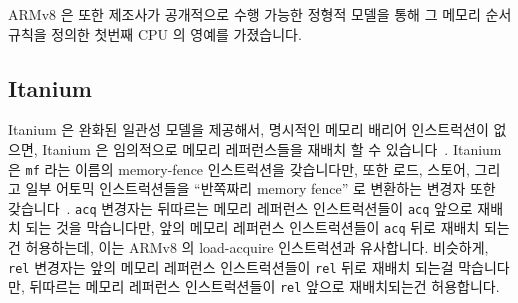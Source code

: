 ARMv8 은 또한 제조사가 공개적으로 수행 가능한 정형적 모델을 통해 그 메모리 순서
규칙을 정의한 첫번째 CPU 의 영예를 가졌습니다.

\subsection{Itanium}
\label{sec:memorder:Itanium}

Itanium 은 완화된 일관성 모델을 제공해서, 명시적인 메모리 배리어 인스트럭션이
없으면, Itanium 은 임의적으로 메모리 레퍼런스들을 재배치 할 수
있습니다~\cite{IntelItanium02v2}.
Itanium 은 {\tt mf} 라는 이름의 memory-fence 인스트럭션을 갖습니다만, 또한
로드, 스토어, 그리고 일부 어토믹 인스트럭션들을 ``반쪽짜리 memory fence'' 로
변환하는 변경자 또한 갖습니다~\cite{IntelItanium02v2}.
{\tt acq} 변경자는 뒤따르는 메모리 레퍼런스 인스트럭션들이 {\tt acq} 앞으로
재배치 되는 것을 막습니다만, 앞의 메모리 레퍼런스 인스트럭션들이 {\tt acq} 뒤로
재배치 되는건 허용하는데, 이는 ARMv8 의 load-acquire 인스트럭션과 유사합니다.
비슷하게, {\tt rel} 변경자는 앞의 메모리 레퍼런스 인스트럭션들이 {\tt rel} 뒤로
재배치 되는걸 막습니다만, 뒤따르는 메모리 레퍼런스 인스트럭션들이 {\tt rel}
앞으로 재배치되는건 허용합니다.

